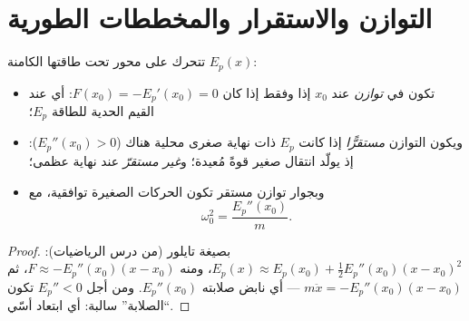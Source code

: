\section{التوازن والاستقرار والمخططات الطورية}

\begin{proposition}\label{prop:b1:work-and-energy:stability}
 تتحرك على محور تحت  طاقتها
الكامنة $E_p(x)$:
\begin{itemize}
  \item تكون في \emph{توازن} عند $x_0$ إذا وفقط إذا كان $F(x_0) = -E_p'(x_0) = 0$:
        أي عند القيم الحدية للطاقة $E_p$؛
  \item ويكون التوازن \emph{مستقرًّا} إذا كانت $E_p$ ذات نهاية صغرى
        محلية هناك ($E_p''(x_0) > 0$): إذ يولّد انتقال صغير قوةً
        مُعيدة؛ و\emph{غير مستقرّ} عند نهاية عظمى؛
  \item وبجوار توازن مستقر تكون الحركات الصغيرة توافقية، مع
        \[
        \omega_0^2 = \frac{E_p''(x_0)}{m} .
        \]
\end{itemize}
\end{proposition}

\begin{proof}
بصيغة تايلور (من درس الرياضيات): $E_p(x) \approx E_p(x_0) +
\tfrac12 E_p''(x_0)(x - x_0)^2$، ومنه $F \approx -E_p''(x_0)(x - x_0)$، ثم
$m\ddot x = -E_p''(x_0)(x - x_0)$ --- أي نابض صلابته $E_p''(x_0)$.
ومن أجل $E_p'' < 0$ تكون ``الصلابة'' سالبة: أي ابتعاد أسّي.
\end{proof}

